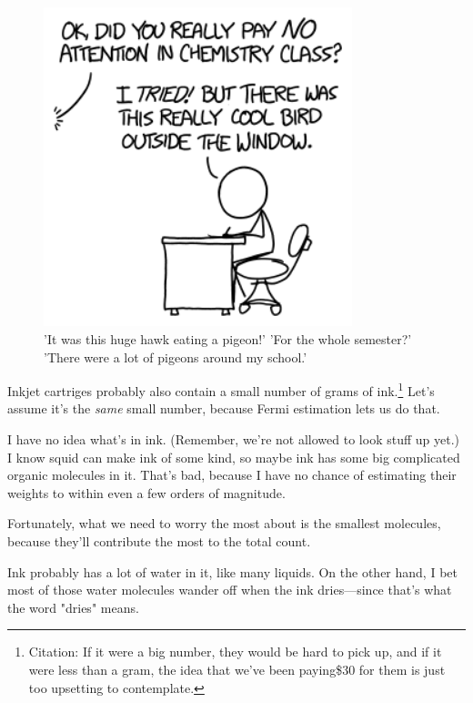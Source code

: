 {\begin{figure}[!htbp]
\centering
\includegraphics[scale=0.5, max width=0.8\textwidth]{imgs/a/106/attention.png}
\caption{'It was this huge hawk eating a pigeon!' 'For the whole semester?' 'There were a lot of pigeons around my school.'}
\end{figure}

{Inkjet cartriges probably also contain a small number of grams of ink.{\footnote{Citation: If it were a big number, they would be hard to pick up, and if it were less than a gram, the idea that we've been paying\$30 for them is just too upsetting to contemplate.} } Let's assume it's the \emph{same} small number, because Fermi estimation lets us do that.}

{I have no idea what's in ink. (Remember, we're not allowed to look stuff up yet.) I know squid can make ink of some kind, so maybe ink has some big complicated organic molecules in it. That's bad, because I have no chance of estimating their weights to within even a few orders of magnitude.}

{Fortunately, what we need to worry the most about is the smallest molecules, because they'll contribute the most to the total count.}

{Ink probably has a lot of water in it, like many liquids. On the other hand, I bet most of those water molecules wander off when the ink dries—since that's what the word "dries" means.}

}
